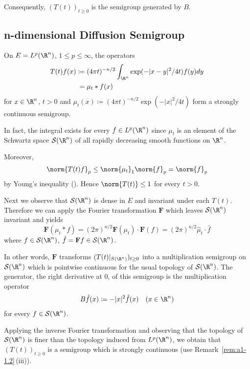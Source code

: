 Consequently, $(T(t))_{t \geq 0}$ is the semigroup generated by $B$.
\subsection{n-dimensional Diffusion Semigroup}\label{subsec:a1-2.8}%
On $E = L^{p}(\R^{n})$, $1 \leq p \leq \infty$, the operators
\begin{align*}
    T(t)f(x) \coloneqq{}& (4\pi t)^{-n/2} \int_{\R^{n}} \exp(-|x-y|^{2}/4t)f(y)dy \\
    ={}& \mu_{t}*f(x)
\end{align*}
for $x \in \R^{n}$, $t > 0$ and $\mu_{t}(x) \coloneqq (4\pi t)^{-n/2} \exp(-|x|^{2}/4t)$ form a strongly continuous semigroup.

In fact, the integral exists for every $f \in L^{p}(\R^{n})$ since $\mu_{t}$ is an element of the Schwartz space $\mathcal{S}(\R^{n})$ of all rapidly decreasing smooth functions on $\R^{n}$.

Moreover,
\[
    \norm{T(t)f}_{p} \leq \norm{\mu_{t}}_{1}\norm{f}_{p} = \norm{f}_{p}
\]
by Young's inequality (\textcite[p.28]{reedsimon:1975}). Hence $\norm{T(t)} \leq 1$ for every $t > 0$.

Next we observe that $\mathcal{S}(\R^{n})$ is dense in $E$ and invariant under each $T(t)$.
Therefore we can apply the Fourier transformation $\mathbf{F}$ which leaves $\mathcal{S}(\R^{n})$ invariant and yields
\[
    \mathbf{F}(\mu_{t}*f) = (2\pi)^{n/2} \mathbf{F}(\mu_{t}) \cdot \mathbf{F}(f) 
    = (2\pi)^{n/2} \hat{\mu}_{t}\cdot\hat{f}
\]
where $f \in \mathcal{S}(\R^{n})$, $\hat{f} = \mathbf{F}f \in \mathcal{S}(\R^{n})$.

In other words, $\mathbf{F}$ transforms $(T(t)\vert_{ S(\R^{n})})_{t \geq 0}$ into a multiplication semigroup on $\mathcal{S}(\R^{n})$ which is pointwise continuous for the usual topology of\/ $\mathcal{S}(\R^{n})$.
The generator, \ie the right derivative at $0$, of this semigroup is the multiplication operator
\[
    B\hat{f}(x) \coloneqq -|x|^{2}\hat{f}(x) \quad (x \in \R^{n})
\]
for every $f \in \mathcal{S}(\R^{n})$.

Applying the inverse Fourier transformation and observing that the topology of\/ $\mathcal{S}(\R^{n})$ is finer than the topology induced from $L^{p}(\R^{n})$, we obtain that $(T(t))_{t \geq 0}$ is a semigroup which is strongly continuous (use Remark~\ref{rem:a1-1.2}\,(iii)).

